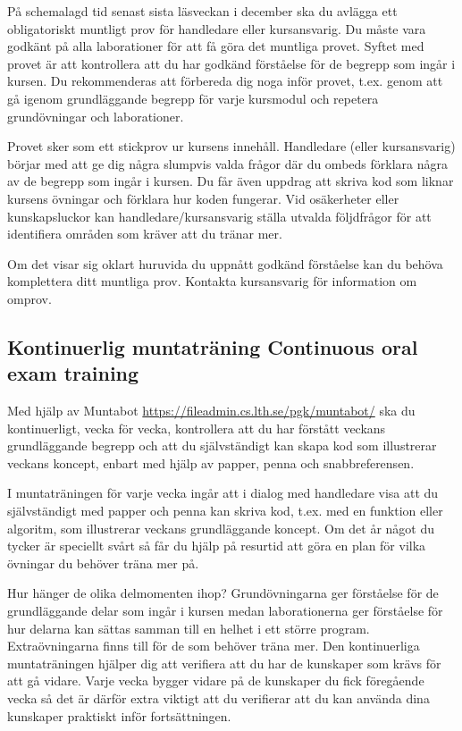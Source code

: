 På schemalagd tid senast sista läsveckan i december ska du avlägga ett obligatoriskt muntligt prov för handledare eller kursansvarig. Du måste vara godkänt på alla laborationer för att få göra det muntliga provet. Syftet med provet är att kontrollera att du har godkänd förståelse för de begrepp som ingår i kursen. Du rekommenderas att förbereda dig noga inför provet, t.ex. genom att gå igenom grundläggande begrepp för varje kursmodul och repetera grundövningar och laborationer.

Provet sker som ett stickprov ur kursens innehåll. Handledare (eller kursansvarig) börjar med att ge dig några slumpvis valda frågor där du ombeds förklara några av de begrepp som ingår i kursen. Du får även uppdrag att skriva kod som liknar kursens övningar och förklara hur koden fungerar. Vid osäkerheter eller kunskapsluckor kan handledare/kursansvarig ställa utvalda följdfrågor för att identifiera områden som kräver att du tränar mer. 

Om det visar sig oklart huruvida du uppnått godkänd förståelse kan du behöva komplettera ditt muntliga prov. Kontakta kursansvarig för information om omprov.  

\subsection{\ifswedish Kontinuerlig muntaträning \else Continuous oral exam training \fi}

Med hjälp av Muntabot \url{https://fileadmin.cs.lth.se/pgk/muntabot/} ska du kontinuerligt, vecka för vecka, kontrollera att du har förstått veckans grundläggande begrepp och att du självständigt kan skapa kod som illustrerar veckans koncept, enbart med hjälp av papper, penna och snabbreferensen. 

I muntaträningen för varje vecka ingår att i dialog med handledare visa att du självständigt med papper och penna kan skriva kod, t.ex. med en funktion eller algoritm, som illustrerar veckans grundläggande koncept. Om det år något du tycker är speciellt svårt så får du hjälp på resurtid att göra en plan för vilka övningar du behöver träna mer på. 

Hur hänger de olika delmomenten ihop? Grundövningarna ger förståelse för de grundläggande delar som ingår i kursen medan laborationerna ger förståelse för hur delarna kan sättas samman till en helhet i ett större program. Extraövningarna finns till för de som behöver träna mer. Den kontinuerliga muntaträningen hjälper dig att verifiera att du har de kunskaper som krävs för att gå vidare. Varje vecka bygger vidare på de kunskaper du fick föregående vecka så det är därför extra viktigt att du verifierar att du kan använda dina kunskaper praktiskt inför fortsättningen. 
